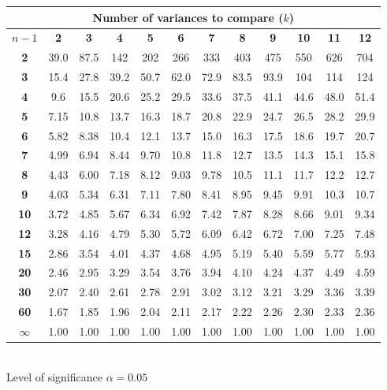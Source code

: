 \begin{raggedright}
\hspace*{0.5cm}
\scriptsize
\begin{tabular}{c|c|c|c|c|c|c|c|c|c|c|c}
\hline
\multicolumn{12}{c}{\textbf{Number of variances to compare} ($k$)}                    \bstrut\tstrut\\
\hline
$n - 1$ & \multicolumn{1}{c}{\textbf{2}}    & \multicolumn{1}{c}{\textbf{3}}    & \multicolumn{1}{c}{\textbf{4}}    & \multicolumn{1}{c}{\textbf{5}}    & \multicolumn{1}{c}{\textbf{6}}    & \multicolumn{1}{c}{\textbf{7}}    & \multicolumn{1}{c}{\textbf{8}}    & \multicolumn{1}{c}{\textbf{9}}    & \multicolumn{1}{c}{\textbf{10}}   & \multicolumn{1}{c}{\textbf{11}}   & \multicolumn{1}{c}{\textbf{12}} \bstrut\tstrut\\
\hline
\textbf{2}     & 39.0 & 87.5 & 142  & 202  & 266  & 333  & 403  & 475  & 550  & 626  & 704  \bstrut\tstrut\\
\textbf{3}     & 15.4 & 27.8 & 39.2 & 50.7 & 62.0 & 72.9 & 83.5 & 93.9 & 104  & 114  & 124  \bstrut\tstrut\\
\textbf{4}     & 9.6  & 15.5 & 20.6 & 25.2 & 29.5 & 33.6 & 37.5 & 41.1 & 44.6 & 48.0 & 51.4 \bstrut\tstrut\\
\textbf{5}     & 7.15 & 10.8 & 13.7 & 16.3 & 18.7 & 20.8 & 22.9 & 24.7 & 26.5 & 28.2 & 29.9 \bstrut\tstrut\\
\textbf{6}     & 5.82 & 8.38 & 10.4 & 12.1 & 13.7 & 15.0 & 16.3 & 17.5 & 18.6 & 19.7 & 20.7 \bstrut\tstrut\\
\textbf{7}     & 4.99 & 6.94 & 8.44 & 9.70 & 10.8 & 11.8 & 12.7 & 13.5 & 14.3 & 15.1 & 15.8 \bstrut\tstrut\\
\textbf{8}     & 4.43 & 6.00 & 7.18 & 8.12 & 9.03 & 9.78 & 10.5 & 11.1 & 11.7 & 12.2 & 12.7 \bstrut\tstrut\\
\textbf{9}     & 4.03 & 5.34 & 6.31 & 7.11 & 7.80 & 8.41 & 8.95 & 9.45 & 9.91 & 10.3 & 10.7 \bstrut\tstrut\\
\textbf{10}    & 3.72 & 4.85 & 5.67 & 6.34 & 6.92 & 7.42 & 7.87 & 8.28 & 8.66 & 9.01 & 9.34 \bstrut\tstrut\\
\textbf{12}    & 3.28 & 4.16 & 4.79 & 5.30 & 5.72 & 6.09 & 6.42 & 6.72 & 7.00 & 7.25 & 7.48 \bstrut\tstrut\\
\textbf{15}    & 2.86 & 3.54 & 4.01 & 4.37 & 4.68 & 4.95 & 5.19 & 5.40 & 5.59 & 5.77 & 5.93 \bstrut\tstrut\\
\textbf{20}    & 2.46 & 2.95 & 3.29 & 3.54 & 3.76 & 3.94 & 4.10 & 4.24 & 4.37 & 4.49 & 4.59 \bstrut\tstrut\\
\textbf{30}    & 2.07 & 2.40 & 2.61 & 2.78 & 2.91 & 3.02 & 3.12 & 3.21 & 3.29 & 3.36 & 3.39 \bstrut\tstrut\\
\textbf{60}    & 1.67 & 1.85 & 1.96 & 2.04 & 2.11 & 2.17 & 2.22 & 2.26 & 2.30 & 2.33 & 2.36 \bstrut\tstrut\\
$\infty$      & 1.00 & 1.00 & 1.00 & 1.00 & 1.00 & 1.00 & 1.00 & 1.00 & 1.00 & 1.00 & 1.00 \bstrut\tstrut\\
\hline
\end{tabular} \\
\hspace*{0.6cm}Level of significance $\alpha = 0.05$
\end{raggedright}


